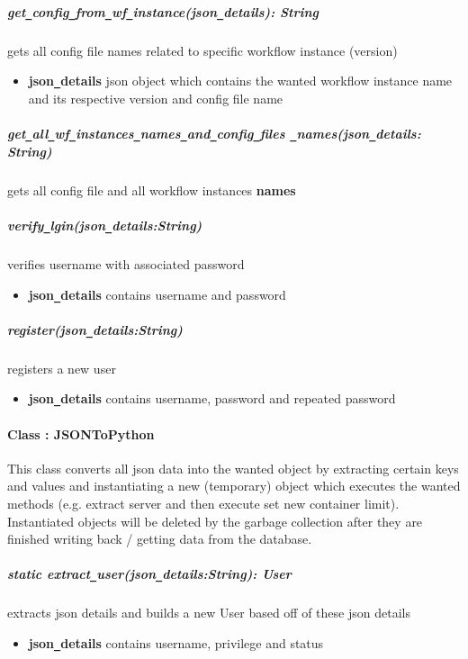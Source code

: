 \subparagraph{get\texttt{\_}config\texttt{\_}from\texttt{\_}wf\texttt{\_}instance(json\texttt{\_}details): String}
gets all config file names related to specific workflow instance (version)
\begin{itemize}
        \item \textbf{json\texttt{\_}details}
        json object which contains the wanted workflow instance name and its respective version and config file name
\end{itemize}


\subparagraph{get\texttt{\_}all\texttt{\_}wf\texttt{\_}instances\texttt{\_}names\texttt{\_}and\texttt{\_}config\texttt{\_}files
\texttt{\_}names(json\texttt{\_}details: String)}
gets all  config file and all workflow instances \textbf{names} 

\subparagraph{verify\texttt{\_}lgin(json\texttt{\_}details:String)}
verifies username with associated password
\begin{itemize}
        \item \textbf{json\texttt{\_}details}
        contains username and password
\end{itemize}

\subparagraph{register(json\texttt{\_}details:String)}
registers a new user
\begin{itemize}
        \item \textbf{json\texttt{\_}details}
        contains username, password and repeated password
\end{itemize}

\paragraph{Class : JSONToPython}
This class converts all json data into the wanted object by extracting certain keys and values and instantiating
a new (temporary) object which executes the wanted methods (e.g. extract server and then execute set new container limit).
Instantiated objects will be deleted by the garbage collection after they are finished writing back / getting data
from the database.

\subparagraph{static extract\texttt{\_}user(json\texttt{\_}details:String): User}
extracts json details and builds a new User based off of these json details
\begin{itemize}
        \item \textbf{json\texttt{\_}details}
        contains username, privilege and status
\end{itemize}

